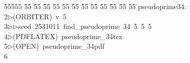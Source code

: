 %
%
\begin{tabbing}
55555 \= 55 \= 55 \= 55 \= 55 \= 55 \= 55 \= 55 \= 55 \= 55 \= 55 \= 55 \= 55 \= \>pseudoprime34:\\[0pt]
2\>$\triangleright$\>(ORBITER)\ v\ 5\ \\[0pt]
3\>$\triangleright$\>$\triangleright$\>seed\ 2531011\ find\_pseudoprime\ 34\ 5\ 5\ 5\ \\[0pt]
4\>$\triangleright$\>(PDFLATEX)\ pseudoprime\_34tex\\[0pt]
5\>$\triangleright$\>(OPEN)\ pseudoprime\_34pdf\\[0pt]
6\>\end{tabbing}
